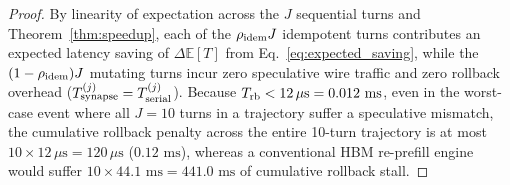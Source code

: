 \documentclass[10pt,conference]{IEEEtran}
\begin{document}
\begin{proof}
By linearity of expectation across the $J$ sequential turns and Theorem~\ref{thm:speedup}, each of the $\rho_{\textnormal{idem}} J$ idempotent turns contributes an expected latency saving of $\Delta \mathbb{E}[T]$ from Eq.~\eqref{eq:expected_saving}, while the $(1 - \rho_{\textnormal{idem}}) J$ mutating turns incur zero speculative wire traffic and zero rollback overhead ($T_{\textnormal{synapse}}^{(j)} = T_{\textnormal{serial}}^{(j)}$). Because $T_{\textnormal{rb}} < 12\,\mu\text{s} = 0.012\text{ ms}$, even in the worst-case event where all $J = 10$ turns in a trajectory suffer a speculative mismatch, the cumulative rollback penalty across the entire 10-turn trajectory is at most $10 \times 12\,\mu\text{s} = 120\,\mu\text{s}$ ($0.12\text{ ms}$), whereas a conventional HBM re-prefill engine would suffer $10 \times 44.1\text{ ms} = 441.0\text{ ms}$ of cumulative rollback stall.
\end{proof}
\end{document}
